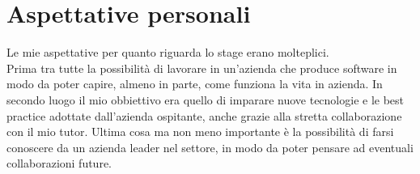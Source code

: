 \section{Aspettative personali}
Le mie aspettative per quanto riguarda lo stage erano molteplici.
\\Prima tra tutte la possibilità di lavorare in un'azienda che produce software in modo da poter capire, almeno in parte, come funziona la vita in azienda.
In secondo luogo il mio obbiettivo era quello di imparare nuove tecnologie e le best practice adottate dall'azienda ospitante, anche grazie alla stretta collaborazione con il mio tutor.
Ultima cosa ma non meno importante è la possibilità di farsi conoscere da un azienda leader nel settore, in modo da poter pensare ad eventuali collaborazioni future.